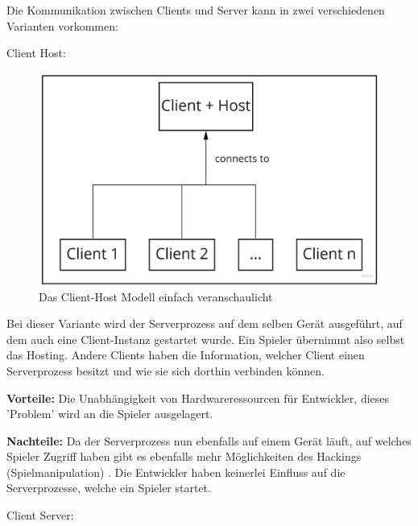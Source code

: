 Die Kommunikation zwischen Clients und Server kann in zwei verschiedenen Varianten vorkommen:

\textsf{\Large Client Host:}

\begin{figure}
	\centering
	\includegraphics{images/Client_Host.jpg}
	\caption[Client-Server Modell]{Das Client-Host Modell einfach veranschaulicht}
	\label{pic:Client_Host}
\end{figure}




Bei dieser Variante wird der Serverprozess auf dem selben Gerät ausgeführt, auf dem auch eine Client-Instanz gestartet wurde. Ein Spieler übernimmt also selbst das Hosting. Andere Clients haben die Information, welcher Client einen Serverprozess besitzt und wie sie sich dorthin verbinden können. 

\textbf{Vorteile:} Die Unabhängigkeit von Hardwareressourcen für Entwickler, dieses 'Problem' wird an die Spieler ausgelagert. 

\textbf{Nachteile:} Da der Serverprozess nun ebenfalls auf einem Gerät läuft, auf welches Spieler Zugriff haben gibt es ebenfalls mehr Möglichkeiten des Hackings (Spielmanipulation) \cite{Wikipedia.2021h}. Die Entwickler haben keinerlei Einfluss auf die Serverprozesse, welche ein Spieler startet.
\cite{Smed.2002}

\textsf{\Large Client Server:}

